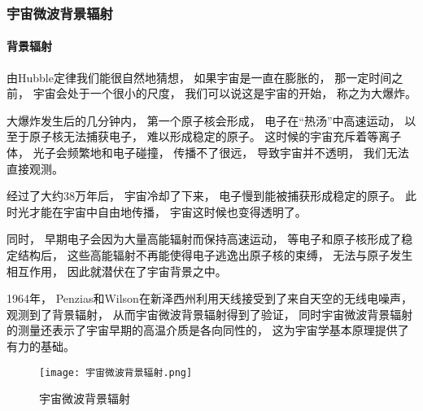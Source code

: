 \documentclass[8pt]{beamer}
\begin{document}
        \begin{frame}[fragile]
            \frametitle{宇宙微波背景辐射}
            \framesubtitle{背景辐射}

            \begin{multicols}{2}
                \qquad
                由Hubble定律我们能很自然地猜想，
                如果宇宙是一直在膨胀的，
                那一定时间之前，
                宇宙会处于一个很小的尺度，
                我们可以说这是宇宙的开始，
                称之为大爆炸。
                
                \qquad
                大爆炸发生后的几分钟内，
                第一个原子核会形成，
                电子在“热汤”中高速运动，
                以至于原子核无法捕获电子，
                难以形成稳定的原子。
                这时候的宇宙充斥着等离子体，
                光子会频繁地和电子碰撞，
                传播不了很远，
                导致宇宙并不透明，
                我们无法直接观测。
                
                \qquad
                经过了大约38万年后，
                宇宙冷却了下来，
                电子慢到能被捕获形成稳定的原子。
                此时光才能在宇宙中自由地传播，
                宇宙这时候也变得透明了。
                
                \qquad
                同时，
                早期电子会因为大量高能辐射而保持高速运动，
                等电子和原子核形成了稳定结构后，
                这些高能辐射不再能使得电子逃逸出原子核的束缚，
                无法与原子发生相互作用，
                因此就潜伏在了宇宙背景之中。

                \qquad
                1964年，
                Penzias和Wilson在新泽西州利用天线接受到了来自天空的无线电噪声，
                观测到了背景辐射，
                从而宇宙微波背景辐射得到了验证，
                同时宇宙微波背景辐射的测量还表示了宇宙早期的高温介质是各向同性的，
                这为宇宙学基本原理提供了有力的基础。

                \begin{figure}[h]
                    \centering
                    \texttt{[image: 宇宙微波背景辐射.png]}  
                    \caption{宇宙微波背景辐射}
                \end{figure}
            \end{multicols}
        \end{frame}
\end{document}
